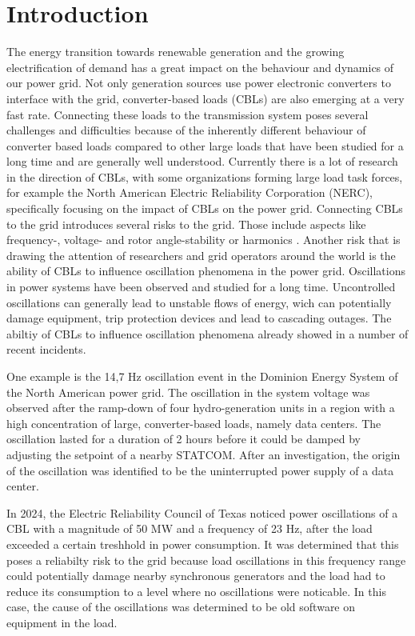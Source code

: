\documentclass[conference]{IEEEtran}
\begin{document}
\section{Introduction}
The energy transition towards renewable generation and the growing electrification of demand has a great impact on the behaviour and dynamics of our power grid. Not only generation sources use power electronic converters to interface with the grid, converter-based loads (CBLs) are also emerging at a very fast rate. Connecting these loads to the transmission system poses several challenges and difficulties because of the inherently different behaviour of converter based loads compared to other large loads that have been studied for a long time and are generally well understood. Currently there is a lot of research in the direction of CBLs, with some organizations forming large load task forces, for example the North American Electric Reliability Corporation (NERC)\cite{nerc}, specifically focusing on the impact of CBLs on the power grid. Connecting CBLs to the grid introduces several risks to the grid. Those include aspects like frequency-, voltage- and rotor angle-stability or harmonics \cite{nerc}. Another risk that is drawing the attention of researchers and grid operators around the world is the ability of CBLs to influence oscillation phenomena in the power grid. Oscillations in power systems have been observed and studied for a long time. Uncontrolled oscillations can generally lead to unstable flows of energy, wich can potentially damage equipment, trip protection devices and lead to cascading outages\cite{esig}. The abiltiy of CBLs to influence oscillation phenomena already showed in a number of recent incidents.

One example is the 14,7 Hz oscillation event in the Dominion Energy System of the North American power grid. The oscillation in the system voltage was observed after the ramp-down of four hydro-generation units in a region with a high concentration of large, converter-based loads, namely data centers. The oscillation lasted for a duration of 2 hours before it could be damped by adjusting the setpoint of a nearby STATCOM. After an investigation, the origin of the oscillation was identified to be the uninterrupted power supply of a data center.\cite{osc}

In 2024, the Electric Reliability Council of Texas noticed power oscillations of a CBL with a magnitude of 50 MW and a frequency of 23 Hz, after the load exceeded a certain treshhold in power consumption. It was determined that this poses a reliabilty risk to the grid because load oscillations in this frequency range could potentially damage nearby synchronous generators and the load had to reduce its consumption to a level where no oscillations were noticable. In this case, the cause of the oscillations was determined to be old software on equipment in the load.\cite{esig}\\
\end{document}
